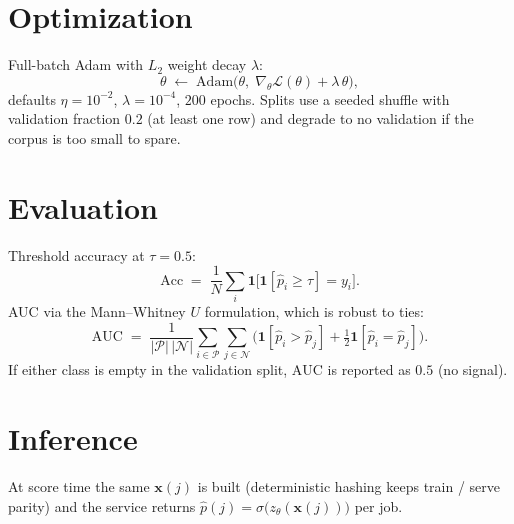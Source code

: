 \documentclass[11pt]{article}
\newcommand{\Ind}{\mathbf{1}}
\newcommand{\Pos}{\mathcal{P}}
\newcommand{\Neg}{\mathcal{N}}
\begin{document}
\section{Optimization}
Full-batch Adam with $L_2$ weight decay $\lambda$:
\[
  \theta \;\leftarrow\; \mathrm{Adam}\!\big(\theta,\; \nabla_\theta \mathcal{L}(\theta) + \lambda\,\theta\big),
\]
defaults $\eta = 10^{-2}$, $\lambda = 10^{-4}$, $200$ epochs. Splits use a
seeded shuffle with validation fraction $0.2$ (at least one row) and degrade
to no validation if the corpus is too small to spare.

\section{Evaluation}
Threshold accuracy at $\tau = 0.5$:
\[
  \mathrm{Acc} \;=\; \frac{1}{N}\sum_i \Ind\!\big[\Ind[\hat{p}_i \ge \tau] = y_i\big].
\]
AUC via the Mann--Whitney $U$ formulation, which is robust to ties:
\[
  \mathrm{AUC} \;=\;
    \frac{1}{|\Pos|\,|\Neg|}
      \sum_{i \in \Pos}\sum_{j \in \Neg}
        \Big( \Ind[\hat{p}_i > \hat{p}_j] + \tfrac{1}{2}\Ind[\hat{p}_i = \hat{p}_j] \Big).
\]
If either class is empty in the validation split, $\mathrm{AUC}$ is reported
as $0.5$ (no signal).

\section{Inference}
At score time the same $\bm{x}(j)$ is built (deterministic hashing keeps
train / serve parity) and the service returns
$\hat{p}(j) = \sigma\!\big(z_\theta(\bm{x}(j))\big)$ per job.
\end{document}

